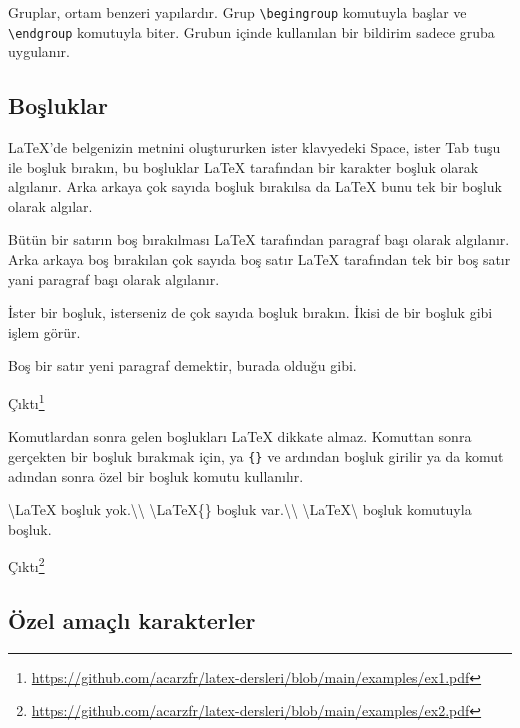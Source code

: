 \documentclass[
  10pt,
]{scrbook}
\newenvironment{Shaded}{\begin{snugshade}}{\end{snugshade}}
\newcommand{\NormalTok}[1]{#1}
\renewcommand{\href}[2]{#2\footnote{\url{#1}}}
\begin{document}
Gruplar, ortam benzeri yapılardır. Grup \texttt{\textbackslash{}begingroup} komutuyla başlar
ve \texttt{\textbackslash{}endgroup} komutuyla biter. Grubun içinde kullanılan bir bildirim
sadece gruba uygulanır.

\hypertarget{boux15fluklar}{%
\subsection{Boşluklar}\label{boux15fluklar}}

LaTeX'de belgenizin metnini oluştururken ister klavyedeki Space, ister
Tab tuşu ile boşluk bırakın, bu boşluklar LaTeX tarafından bir karakter
boşluk olarak algılanır. Arka arkaya çok sayıda boşluk bırakılsa da
LaTeX bunu tek bir boşluk olarak algılar.

Bütün bir satırın boş bırakılması LaTeX tarafından paragraf başı olarak
algılanır. Arka arkaya boş bırakılan çok sayıda boş satır LaTeX
tarafından tek bir boş satır yani paragraf başı olarak algılanır.

\begin{Shaded}
\begin{Highlighting}[]
\NormalTok{ İster bir boşluk, isterseniz de çok         sayıda boşluk bırakın. }
\NormalTok{İkisi de bir boşluk gibi işlem görür. }

\NormalTok{Boş bir satır yeni paragraf demektir, burada olduğu gibi.}
\end{Highlighting}
\end{Shaded}

\href{https://github.com/acarzfr/latex-dersleri/blob/main/examples/ex1.pdf}{Çıktı}

Komutlardan sonra gelen boşlukları LaTeX dikkate almaz. Komuttan sonra
gerçekten bir boşluk bırakmak için, ya \texttt{\{\}} ve ardından boşluk girilir
ya da komut adından sonra özel bir boşluk komutu kullanılır.

\begin{Shaded}
\begin{Highlighting}[]
\NormalTok{\textbackslash{}LaTeX  boşluk yok.\textbackslash{}\textbackslash{}}
\NormalTok{\textbackslash{}LaTeX\{\} boşluk var.\textbackslash{}\textbackslash{}}
\NormalTok{\textbackslash{}LaTeX\textbackslash{} boşluk komutuyla  boşluk.}
\end{Highlighting}
\end{Shaded}

\href{https://github.com/acarzfr/latex-dersleri/blob/main/examples/ex2.pdf}{Çıktı}

\hypertarget{uxf6zel-amauxe7lux131-karakterler}{%
\subsection{Özel amaçlı karakterler}\label{uxf6zel-amauxe7lux131-karakterler}}
\end{document}
